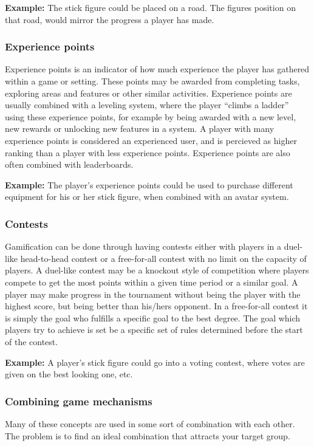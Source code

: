\textbf{Example:} The stick figure could be placed on a road. The figures position on that road, would mirror the progress a player has made. 

\subsubsection{Experience points}
Experience points is an indicator of how much experience the player has gathered within a game or setting. These points may be awarded from completing tasks, exploring areas and features or other similar activities. Experience points are usually combined with a leveling system, where the player ``climbs a ladder'' using these experience points, for example by being awarded with a new level, new rewards or unlocking new features in a system. A player with many experience points is considered an experienced user, and is percieved as higher ranking than a player with less experience points. Experience points are also often combined with leaderboards. 

\textbf{Example:} The player's experience points could be used to purchase different equipment for his or her stick figure, when combined with an avatar system.

\subsubsection{Contests}
Gamification can be done through having contests either with players in a duel-like head-to-head contest or a free-for-all contest with no limit on the capacity of players. A duel-like contest may be a knockout style of competition where players compete to get the most points within a given time period or a similar goal. A player may make progress in the tournament without being the player with the highest score, but being better than his/hers opponent. In a free-for-all contest it is simply the goal who fulfills a specific goal to the best degree. The goal which players try to achieve is set be a specific set of rules determined before the start of the contest.

\textbf{Example:} A player's stick figure could go into a voting contest, where votes are given on the best looking one, etc. 

\subsubsection{Combining game mechanisms}

Many of these concepts are used in some sort of combination with each other. The problem is to find an ideal combination that attracts your target group.  




